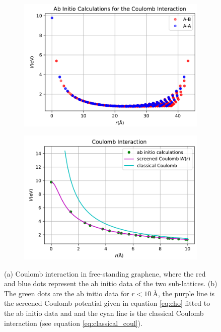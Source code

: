 \begin{figure}[H]
\centering
\begin{subfigure}[b]{.49\textwidth}
  \centering
  \includegraphics[width=\textwidth]{img/ab_initio_coul.pdf}
  \caption{}
  \label{fig:ab_initio_coul}
\end{subfigure}
\begin{subfigure}[b]{.49\textwidth}
  \centering
  \includegraphics[width=\textwidth]{img/FSG_Cho_2018.pdf}
  \caption{}
  \label{fig:fsg_cho}
\end{subfigure}
\caption{(a) Coulomb interaction in free-standing graphene, where the red and blue dots represent the ab initio data of the two sub-lattices. (b) The green dots are the ab initio data for $r<\SI{10}{\angstrom}$, the purple line is the screened Coulomb potential given in equation \ref{eq:cho} fitted to the ab initio data and and the cyan line is the classical Coulomb interaction (see equation \ref{eq:classical_coul}).}
\end{figure}

